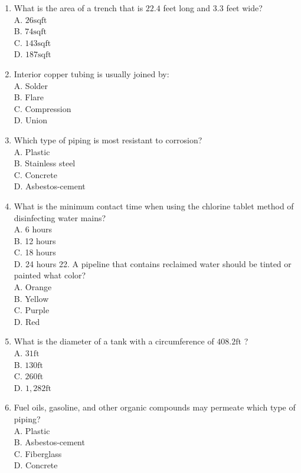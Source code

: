 \documentclass[10pt]{article}
\begin{document}
\begin{enumerate}
  \item What is the area of a trench that is $22.4$ feet long and $3.3$ feet wide?\\
A. $26 \mathrm{sq} \mathrm{ft}$\\
B. $74 \mathrm{sq} \mathrm{ft}$\\
C. $143 \mathrm{sq} \mathrm{ft}$\\
D. $187 \mathrm{sq} \mathrm{ft}$

  \item Interior copper tubing is usually joined by:\\
A. Solder\\
B. Flare\\
C. Compression\\
D. Union

  \item Which type of piping is most resistant to corrosion?\\
A. Plastic\\
B. Stainless steel\\
C. Concrete\\
D. Asbestos-cement

  \item What is the minimum contact time when using the chlorine tablet method of disinfecting water mains?\\
A. 6 hours\\
B. 12 hours\\
C. 18 hours\\
D. 24 hours 22. A pipeline that contains reclaimed water should be tinted or painted what color?\\
A. Orange\\
B. Yellow\\
C. Purple\\
D. Red

  \item What is the diameter of a tank with a circumference of $408.2 \mathrm{ft}$ ?\\
A. $31 \mathrm{ft}$\\
B. $130 \mathrm{ft}$\\
C. $260 \mathrm{ft}$\\
D. $1,282 \mathrm{ft}$

  \item Fuel oils, gasoline, and other organic compounds may permeate which type of piping?\\
A. Plastic\\
B. Asbestos-cement\\
C. Fiberglass\\
D. Concrete


\end{enumerate}
\end{document}
